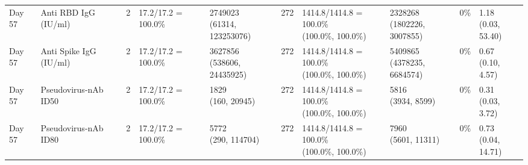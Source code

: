 \documentclass[]{book}
\theoremstyle{definition}
\theoremstyle{definition}
\theoremstyle{definition}
\newcommand{\1}{\mathbbm{1}}
\begin{document}
\begin{landscape}
\begin{ThreePartTable}
\begin{longtable}[t]{>{\raggedright\arraybackslash}p{1cm}lllllllll}
Day 57 & Anti RBD IgG (IU/ml) & 2 & 17.2/17.2 = 100.0\% & \makecell[l]{2749023\\(61314, 123253076)} & 272 & \makecell[l]{1414.8/1414.8 = 100.0\%\\(100.0\%, 100.0\%)} & \makecell[l]{2328268\\(1802226, 3007855)} & 0\% & \makecell[l]{1.18\\(0.03, 53.40)}\\
Day 57 & Anti Spike IgG (IU/ml) & 2 & 17.2/17.2 = 100.0\% & \makecell[l]{3627856\\(538606, 24435925)} & 272 & \makecell[l]{1414.8/1414.8 = 100.0\%\\(100.0\%, 100.0\%)} & \makecell[l]{5409865\\(4378235, 6684574)} & 0\% & \makecell[l]{0.67\\(0.10, 4.57)}\\
Day 57 & Pseudovirus-nAb ID50 & 2 & 17.2/17.2 = 100.0\% & \makecell[l]{1829\\(160, 20945)} & 272 & \makecell[l]{1414.8/1414.8 = 100.0\%\\(100.0\%, 100.0\%)} & \makecell[l]{5816\\(3934, 8599)} & 0\% & \makecell[l]{0.31\\(0.03, 3.72)}\\
Day 57 & Pseudovirus-nAb ID80 & 2 & 17.2/17.2 = 100.0\% & \makecell[l]{5772\\(290, 114704)} & 272 & \makecell[l]{1414.8/1414.8 = 100.0\%\\(100.0\%, 100.0\%)} & \makecell[l]{7960\\(5601, 11311)} & 0\% & \makecell[l]{0.73\\(0.04, 14.71)}\\*
\end{longtable}
\end{ThreePartTable}


\clearpage


\end{landscape}
\end{document}
